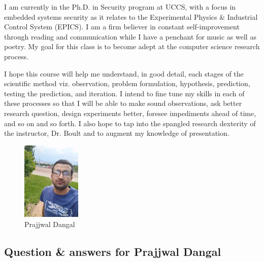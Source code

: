 I am currently in the Ph.D. in Security program at UCCS, with a focus in embedded systems security as it relates to the Experimental Physics \& Industrial Control System (EPICS). I am a firm believer in constant self-improvement through reading and communication while I have a penchant for music as well as poetry. My goal for this class is to become adept at the computer science research process. \par I hope this course will help me understand, in good detail, each stages of the scientific method viz. observation, problem formulation, hypothesis, prediction, testing the prediction, and iteration. I intend to fine tune my skills in each of these processes so that I will be able to make sound observations, ask better research question, design experiments better, foresee impediments ahead of time, and so on and so forth. I also hope to tap into the spangled research dexterity of the instructor, Dr. Boult and to augment my knowledge of presentation.


\begin{figure} [h]
    \captionsetup{justification=centering}
    \centering
    \includegraphics [width= 0.25\textwidth] {Dangal-UCCS}
    \caption{Prajjwal Dangal}
    \label{fig:my_label}
\end{figure}

%

\subsection{Question \& answers for Prajjwal Dangal}


    
    
